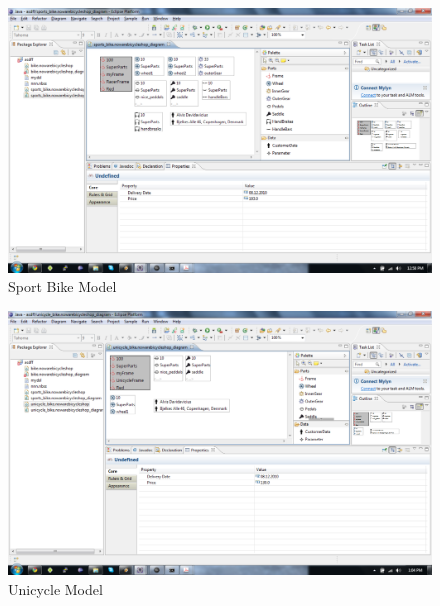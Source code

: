 \begin{figure}[H]
    \begin{center}
        \includegraphics[width=\textwidth]{fig/gmf/gmf_sport_model.pdf}
        \caption{Sport Bike Model}
        \label{fig.gmf_sport_model}
    \end{center}
\end{figure}

\begin{figure}[H]
    \begin{center}
        \includegraphics[width=\textwidth]{fig/gmf/gmf_unicycle_model.pdf}
        \caption{Unicycle Model}
        \label{fig.gmf_unicycle_model}
    \end{center}
\end{figure}